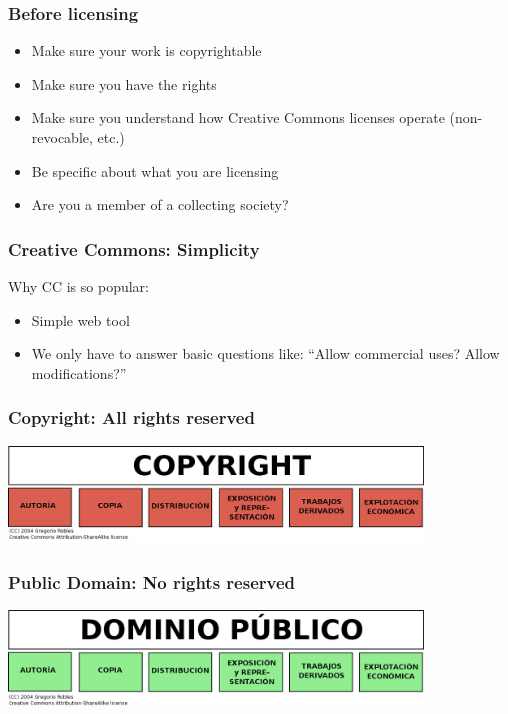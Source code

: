\documentclass{beamer}
\begin{document}
\begin{frame}
\frametitle{Before licensing}


\begin{itemize}
\item Make sure your work is copyrightable
\item Make sure you have the rights
\item Make sure you understand how Creative Commons licenses operate (non-revocable, etc.)
\item Be specific about what you are licensing
\item Are you a member of a collecting society? 
\end{itemize}

\end{frame}



\begin{frame}
\frametitle{Creative Commons: Simplicity}

Why CC is so popular:

\begin{itemize}
\item Simple web tool
\item We only have to answer basic questions like: ``Allow commercial uses? Allow modifications?''
\end{itemize}

\end{frame}



\begin{frame}
\frametitle{Copyright: All rights reserved}

\includegraphics[width=11cm]{figs/Copyright.png}

\end{frame}


\begin{frame}
\frametitle{Public Domain: No rights reserved}

\includegraphics[width=11cm]{figs/DominioPublico.png}

\end{frame}
\end{document}
